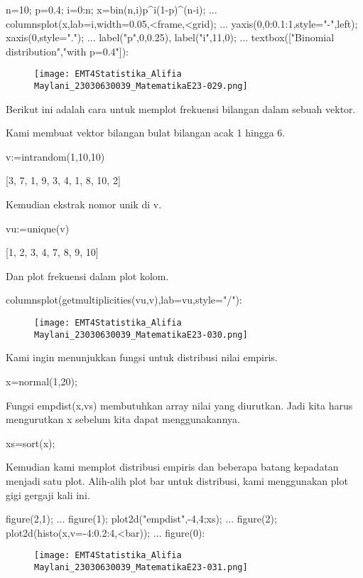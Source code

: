 \documentclass{article}
\begin{document}
\>n=10; p=0.4; i=0:n; x=bin(n,i)\*p^i\*(1-p)^(n-i); ...  
\>   columnsplot(x,lab=i,width=0.05,<frame,<grid); ...  
\>   yaxis(0,0:0.1:1,style="-\>",\>left); xaxis(0,style="."); ...  
\>   label("p",0,0.25), label("i",11,0); ...  
\>   textbox(["Binomial distribution","with p=0.4"]):


\begin{figure}
    \centering
    \texttt{[image: EMT4Statistika\_Alifia Maylani\_23030630039\_MatematikaE23-029.png]}
    \caption{}
    \label{fig:enter-label}
\end{figure}

Berikut ini adalah cara untuk memplot frekuensi bilangan dalam sebuah
vektor.


Kami membuat vektor bilangan bulat bilangan acak 1 hingga 6.


\>v:=intrandom(1,10,10)


    [3,  7,  1,  9,  3,  4,  1,  8,  10,  2]

Kemudian ekstrak nomor unik di v.


\>vu:=unique(v)


    [1,  2,  3,  4,  7,  8,  9,  10]

 Dan plot frekuensi dalam plot kolom.  

\>columnsplot(getmultiplicities(vu,v),lab=vu,style="/"):


\begin{figure}
    \centering
    \texttt{[image: EMT4Statistika\_Alifia Maylani\_23030630039\_MatematikaE23-030.png]}
    \caption{}
    \label{fig:enter-label}
\end{figure}

Kami ingin menunjukkan fungsi untuk distribusi nilai empiris.


\>x=normal(1,20);


Fungsi empdist(x,vs) membutuhkan array nilai yang diurutkan. Jadi kita
harus mengurutkan x sebelum kita dapat menggunakannya.


\>xs=sort(x);


Kemudian kami memplot distribusi empiris dan beberapa batang kepadatan
menjadi satu plot. Alih-alih plot bar untuk distribusi, kami
menggunakan plot gigi gergaji kali ini.


\>figure(2,1); ...  
\>   figure(1); plot2d("empdist",-4,4;xs); ...  
\>   figure(2); plot2d(histo(x,v=-4:0.2:4,<bar));  ...  
\>   figure(0):


\begin{figure}
    \centering
    \texttt{[image: EMT4Statistika\_Alifia Maylani\_23030630039\_MatematikaE23-031.png]}
    \caption{}
    \label{fig:enter-label}
\end{figure}
\end{document}
